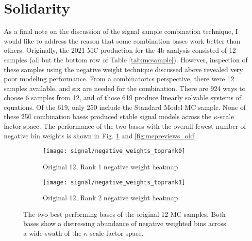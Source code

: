 \FloatBarrier
\section{Solidarity} \label{sec:solidarity}
    
    As a final note on the discussion of the signal sample combination technique,
        I would like to address the reason that some combination bases work better than others.
    Originally, the 2021 MC production for the 4b analysis consisted of 12 samples (all but the bottom row of Table \ref{tab:mcsample}).
    However, inspection of these samples using the negative weight technique discussed above revealed very poor modeling performance.
    From a combinatorics perspective, there were 12 samples available, and six are needed for the combination.
    There are 924 ways to choose 6 samples from 12, and of those 619 produce linearly solvable systems of equations.
    Of the 619, only 250 include the Standard Model MC sample.
    None of these 250 combination bases produced stable signal models across the $\kappa$-scale factor space.
    The performance of the two bases with the overall fewest number of negative bin weights is shown in Fig. \ref{fig:mcnWeight_old} and \ref{fig:mcpreviews_old}.

    \begin{figure}[tbh]
    	\centering
        \begin{subfigure}{0.44\textwidth}
            \texttt{[image: signal/negative\_weights\_toprank0]}
            \captionsetup{justification=centering} \caption{Original 12, Rank 1 negative weight heatmap}
        \end{subfigure}
        \begin{subfigure}{0.44\textwidth}
            \texttt{[image: signal/negative\_weights\_toprank1]}
            \captionsetup{justification=centering} \caption{Original 12, Rank 2 negative weight heatmap}
        \end{subfigure}
        \caption{
            The two best performing bases of the original 12 MC samples.
            Both bases show a distressing abundance of negative weighted bins across a wide swath of the $\kappa$-scale factor space.
        }
        \label{fig:mcnWeight_old}
    \end{figure}


